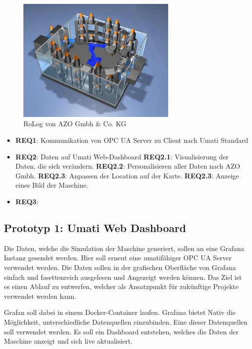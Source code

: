 \documentclass[a4paper, 12pt, oneside, toc=listofnumbered, bibliography=totoc]{scrbook}
\begin{document}
		\begin{figure}[H]
			\centering
			\includegraphics[width=0.7\textwidth]{res/RoLog.png}
			\caption{RoLog von AZO Gmbh \& Co. KG \cite{noauthor_azo_nodate}}
			\label{fig:RoLog}
		\end{figure}
	
		
		\begin{itemize}
			\item \textbf{REQ1}: Kommunikation von OPC UA Server zu Client nach Umati Standard
			\item \textbf{REQ2}: Daten auf Umati Web-Dashboard
			\subitem \textbf{REQ2.1}: Visualisierung der Daten, die sich verändern.
			\subitem \textbf{REQ2.2}: Personalisieren aller Daten nach AZO Gmbh.
			\subitem \textbf{REQ2.3}: Anpassen der Location auf der Karte.
			\subitem \textbf{REQ2.3}: Anzeige eines Bild der Maschine.
			\item \textbf{REQ3}: 
		\end{itemize}
		
		\subsection{Prototyp 1: Umati Web Dashboard}
		
		Die Daten, welche die Simulation der Maschine generiert, sollen an eine Grafana Instanz gesendet werden. Hier soll erneut eine umatifähiger OPC UA Server verwendet werden. Die Daten sollen in der grafischen Oberfläche von Grafana einfach und fasettenreich ausgelesen und Angezeigt werden können. Das Ziel ist es einen Ablauf zu entwerfen, welcher als Ansatzpunkt für zukünftige Projekte verwendet werden kann. 
		
		Grafan soll dabei in einem Docker-Container laufen. Grafana bietet Nativ die Möglichkeit, unterschiedliche Datenquellen einzubinden. Eine dieser Datenquellen soll verwendet werden. Es soll ein Dashboard entstehen, welches die Daten der Maschine anzeigt und sich live aktualisiert.
		
\end{document}
